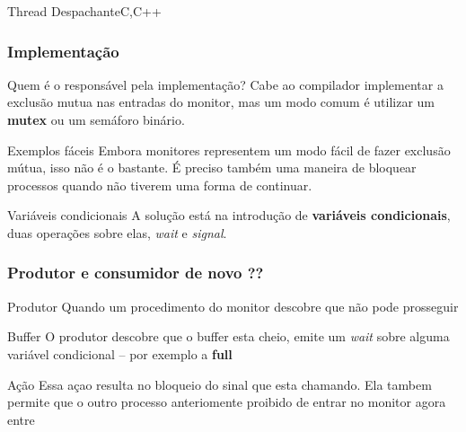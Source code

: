 \documentclass[11pt]{beamer}
\begin{document}
\begin{frame}{ Thread Despachante}{C,C++}
\lstDsp
\end{frame}


\begin{frame}\frametitle{ Implementação}

\begin{alertblock}{ Quem é o responsável pela implementação?}
  Cabe ao compilador implementar a exclusão mutua nas entradas do monitor, mas um modo comum é utilizar um \textbf{mutex} ou um semáforo binário.
\end{alertblock}

\pause
\begin{exampleblock}{ Exemplos fáceis}
	Embora monitores representem um modo fácil de fazer exclusão mútua, isso não é o bastante. É preciso também uma maneira de bloquear processos quando não tiverem uma forma de continuar.
\end{exampleblock}

\pause
\begin{block}{ Variáveis condicionais}
	A solução está na introdução de \textbf{variáveis condicionais}, duas operações sobre elas, \textit{wait} e \textit{signal}.
\end{block}

\end{frame}


\begin{frame}\frametitle{ Produtor e consumidor de novo ??}

\begin{block}{ Produtor}
	Quando um procedimento do monitor descobre que não pode prosseguir
\end{block}

\pause
\begin{exampleblock}{ Buffer}
	O produtor descobre que o buffer esta cheio, emite um \textit{wait} sobre alguma variável condicional -- por exemplo a \textbf{full}
\end{exampleblock}

\pause
\begin{block}{ Ação}
	Essa açao resulta no bloqueio do sinal que esta chamando. Ela tambem permite que o outro processo anteriomente proibido de entrar no monitor agora entre
\end{block}

\end{frame}
\end{document}
